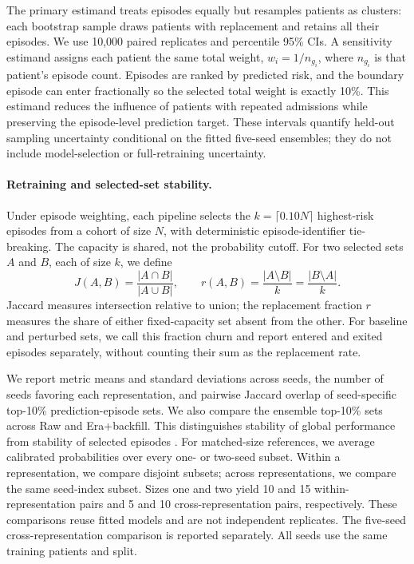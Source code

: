 \documentclass{article}
\newcommand{\topten}{top-10\%}
\newcommand{\ci}{95\% CI}
\begin{document}
The primary estimand treats episodes equally but resamples patients as
clusters: each bootstrap sample draws patients with replacement and retains all
their episodes. We use 10,000 paired replicates and percentile \ci{}s. A
sensitivity estimand assigns each patient the same total weight,
$w_i=1/n_{g_i}$, where $n_{g_i}$ is that patient's episode count. Episodes are ranked by predicted risk,
and the boundary episode can enter fractionally so the selected total weight is
exactly 10\%. This estimand reduces the influence of patients with repeated
admissions while preserving the episode-level prediction target. These
intervals quantify held-out sampling uncertainty conditional on the fitted
five-seed ensembles; they do not include model-selection or full-retraining
uncertainty.

\paragraph{Retraining and selected-set stability.}

Under episode weighting, each pipeline selects the $k=\lceil0.10N\rceil$
highest-risk episodes from a cohort of size $N$, with deterministic
episode-identifier tie-breaking. The capacity is shared, not the probability
cutoff. For two selected sets $A$ and $B$, each of size $k$, we define
\[
J(A,B)=\frac{|A\cap B|}{|A\cup B|},\qquad
r(A,B)=\frac{|A\setminus B|}{k}=\frac{|B\setminus A|}{k}.
\]
Jaccard measures intersection relative to union; the replacement fraction $r$
measures the share of either fixed-capacity set absent from the other. For
baseline and perturbed sets, we call this fraction churn and report entered and
exited episodes separately, without counting their sum as the replacement rate.

We report metric means and standard deviations across seeds, the number of
seeds favoring each representation, and pairwise Jaccard overlap of seed-specific
\topten{} prediction-episode sets. We also compare the ensemble \topten{} sets
across Raw and Era+backfill. This distinguishes stability of global performance
from stability of selected episodes \citep{lopezmartinez2022instability}.
For matched-size references, we average calibrated probabilities over every
one- or two-seed subset. Within a representation, we compare disjoint subsets;
across representations, we compare the same seed-index subset. Sizes one and
two yield 10 and 15 within-representation pairs and 5 and 10 cross-representation
pairs, respectively. These comparisons reuse fitted models and are not
independent replicates. The five-seed cross-representation comparison is
reported separately. All seeds use the same training patients and split.
\end{document}
